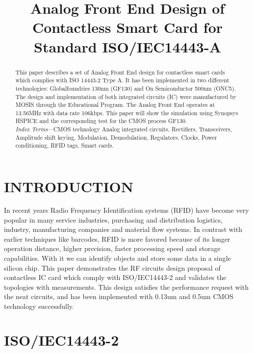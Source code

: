 \documentclass[a4paper, 10pt, conference]{ieeeconf}      %
\title{Analog Front End Design of Contactless Smart Card for Standard ISO/IEC14443-A}
\author{}
\begin{document}
\maketitle
\thispagestyle{empty}
\pagestyle{empty}


\begin{abstract}
This paper describes a set of Analog Front End design for contactless smart cards which complies with ISO 14443-2 Type A. It has been implemented in two different technologies: Globalfoundries 130nm (GF130) and On Semiconductor 500nm (ONC5). The design and implementation of both integrated circuits (IC) were manufactured by MOSIS through the Educational Program. The Analog Front End operates at 13.56MHz with data rate 106kbps. This paper will show the simulation using Synopsys HSPICE and the corresponding test for the CMOS process GF130. \\
\textit{Index Terms}—CMOS technology Analog integrated circuits, Rectifiers, Transceivers, Amplitude shift keying, Modulation, Demodulation, Regulators, Clocks, Power conditioning, RFID tags, Smart cards.
\end{abstract}



\section{INTRODUCTION}
In recent years Radio Frequency Identification systems
(RFID) \cite{c1} have become very popular in many service industries,
purchasing and distribution logistics, industry, manufacturing
companies and material flow systems. In contrast
with earlier techniques like barcodes, RFID is more favored
because of its longer operation distance, higher precision,
faster processing speed and storage capabilities. With it we
can identify objects and store some data in a single silicon
chip. This paper demonstrates the RF circuits design proposal
of contactless IC card which comply with ISO/IEC14443-2 \cite{c2}
and validates the topologies with measurements. This design
satisfies the performance request with the neat circuits, and has
been implemented with 0.13um and 0.5um CMOS technology
successfully.

\section{ISO/IEC14443-2}
\end{document}
